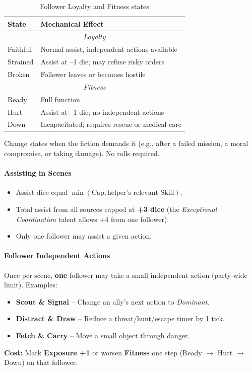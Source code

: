 \begin{table}[htbp]
\centering
\small
\begin{tabularx}{\linewidth}{lX}
\toprule
\textbf{State} & \textbf{Mechanical Effect} \\
\midrule
\multicolumn{2}{c}{\textit{Loyalty}} \\
Faithful & Normal assist, independent actions available \\
Strained & Assist at --1 die; may refuse risky orders \\
Broken & Follower leaves or becomes hostile \\
\midrule
\multicolumn{2}{c}{\textit{Fitness}} \\
Ready & Full function \\
Hurt & Assist at --1 die; no independent actions \\
Down & Incapacitated; requires rescue or medical care \\
\bottomrule
\end{tabularx}
\caption{Follower Loyalty and Fitness states}
\label{tab:follower-states}
\end{table}

Change states when the fiction demands it (e.g., after a failed mission, a moral compromise, or taking damage). No rolls required.

\paragraph{Assisting in Scenes}
\begin{itemize}
  \item Assist dice equal \(\min(\text{Cap}, \text{helper's relevant Skill})\).
  \item Total assist from all sources capped at \textbf{+3 dice} (the \textit{Exceptional Coordination} talent allows +4 from one follower).
  \item Only one follower may assist a given action.
\end{itemize}

\paragraph{Follower Independent Actions}
Once per scene, \textbf{one} follower may take a small independent action (party-wide limit). Examples:
\begin{itemize}
  \item \textbf{Scout \& Signal} -- Change an ally's next action to \textit{Dominant}.
  \item \textbf{Distract \& Draw} -- Reduce a threat/hunt/escape timer by 1 tick.
  \item \textbf{Fetch \& Carry} -- Move a small object through danger.
\end{itemize}
\textbf{Cost:} Mark \textbf{Exposure +1} or worsen \textbf{Fitness} one step (Ready $\rightarrow$ Hurt $\rightarrow$ Down) on that follower.

